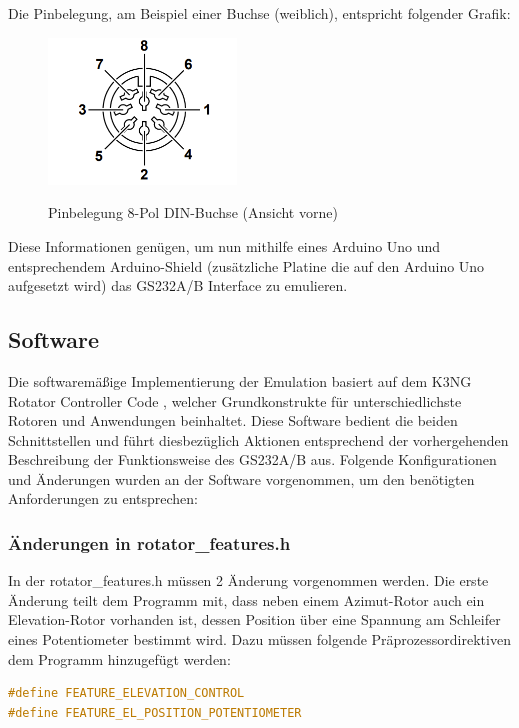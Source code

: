 Die Pinbelegung, am Beispiel einer Buchse (weiblich), entspricht folgender Grafik: 
\begin{figure}[H]
	\centering
	\includegraphics[width=5cm]{../ref/RotorInterfacePinbelegung.png}
	\label{fig:Rotor_Interface_Pinbelegung}
	\caption{Pinbelegung 8-Pol DIN-Buchse (Ansicht vorne) \cite{noauthor_yaesu_nodate}}
\end{figure}

Diese Informationen genügen, um nun mithilfe eines Arduino Uno und entsprechendem Arduino-Shield (zusätzliche Platine die auf den Arduino Uno aufgesetzt wird) das GS232A/B Interface zu emulieren.

\subsection{Software}
Die softwaremäßige Implementierung der Emulation basiert auf dem K3NG Rotator Controller Code \cite{good_k3ngk3ng_rotator_controller_2024}, welcher Grundkonstrukte für unterschiedlichste Rotoren und Anwendungen beinhaltet. Diese Software bedient die beiden Schnittstellen und führt diesbezüglich Aktionen entsprechend der vorhergehenden Beschreibung der Funktionsweise des GS232A/B aus. Folgende Konfigurationen und Änderungen wurden an der Software vorgenommen, um den benötigten Anforderungen zu entsprechen:

\subsubsection{Änderungen in rotator\_features.h}
In der rotator\_features.h müssen 2 Änderung vorgenommen werden. Die erste Änderung teilt dem Programm mit, dass neben einem Azimut-Rotor auch ein Elevation-Rotor vorhanden ist, dessen Position über eine Spannung am Schleifer eines Potentiometer bestimmt wird. Dazu müssen folgende Präprozessordirektiven dem Programm hinzugefügt werden:

\begin{lstlisting}[language=C++]
#define FEATURE_ELEVATION_CONTROL
#define FEATURE_EL_POSITION_POTENTIOMETER
\end{lstlisting}

